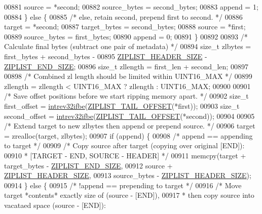 \begin{DoxyCode}
{{00881         source = *second;
00882         source\_bytes = second\_bytes;
00883         append = 1;
00884     \} \textcolor{keywordflow}{else} \{
00885         \textcolor{comment}{/* else, retain second, prepend first to second. */}
00886         target = *second;
00887         target\_bytes = second\_bytes;
00888         source = *first;
00889         source\_bytes = first\_bytes;
00890         append = 0;
00891     \}
00892 
00893     \textcolor{comment}{/* Calculate final bytes (subtract one pair of metadata) */}
00894     size\_t zlbytes = first\_bytes + second\_bytes -
00895                      \hyperlink{ziplist_8c_a3b8ef40d77ce00bcad424d0c07e2de95}{ZIPLIST\_HEADER\_SIZE} - 
      \hyperlink{ziplist_8c_ab15031d20f1d4b1a8b6bc843752958ee}{ZIPLIST\_END\_SIZE};
00896     size\_t zllength = first\_len + second\_len;
00897 
00898     \textcolor{comment}{/* Combined zl length should be limited within UINT16\_MAX */}
00899     zllength = zllength < UINT16\_MAX ? zllength : UINT16\_MAX;
00900 
00901     \textcolor{comment}{/* Save offset positions before we start ripping memory apart. */}
00902     size\_t first\_offset = \hyperlink{endianconv_8h_a4e85d9ae58a3b1e6ceaabfd4689002c7}{intrev32ifbe}(\hyperlink{ziplist_8c_adf2235d74c81861c85fb5d2ffa209397}{ZIPLIST\_TAIL\_OFFSET}(*first));
00903     size\_t second\_offset = \hyperlink{endianconv_8h_a4e85d9ae58a3b1e6ceaabfd4689002c7}{intrev32ifbe}(\hyperlink{ziplist_8c_adf2235d74c81861c85fb5d2ffa209397}{ZIPLIST\_TAIL\_OFFSET}(*second));
00904 
00905     \textcolor{comment}{/* Extend target to new zlbytes then append or prepend source. */}
00906     target = zrealloc(target, zlbytes);
00907     \textcolor{keywordflow}{if} (append) \{
00908         \textcolor{comment}{/* append == appending to target */}
00909         \textcolor{comment}{/* Copy source after target (copying over original [END]):}
00910 \textcolor{comment}{         *   [TARGET - END, SOURCE - HEADER] */}
00911         memcpy(target + target\_bytes - \hyperlink{ziplist_8c_ab15031d20f1d4b1a8b6bc843752958ee}{ZIPLIST\_END\_SIZE},
00912                source + \hyperlink{ziplist_8c_a3b8ef40d77ce00bcad424d0c07e2de95}{ZIPLIST\_HEADER\_SIZE},
00913                source\_bytes - \hyperlink{ziplist_8c_a3b8ef40d77ce00bcad424d0c07e2de95}{ZIPLIST\_HEADER\_SIZE});
00914     \} \textcolor{keywordflow}{else} \{
00915         \textcolor{comment}{/* !append == prepending to target */}
00916         \textcolor{comment}{/* Move target *contents* exactly size of (source - [END]),}
00917 \textcolor{comment}{         * then copy source into vacataed space (source - [END]):}
}}
\end{DoxyCode}
